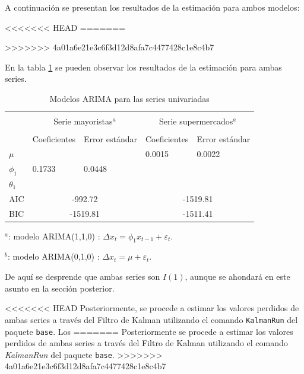 \documentclass[12pt, twoside]{book}\usepackage[]{graphicx}\usepackage[]{color}
\numberwithin{equation}{section}
\numberwithin{theorem}{section}
\numberwithin{teorema}{section}
\numberwithin{defi}{section}
\numberwithin{prop}{section}
\numberwithin{defi}{section}
\theoremstyle{plain}
\begin{document}
A continuación se presentan los resultados de la estimación para ambos modelos: 

<<<<<<< HEAD
=======

>>>>>>> 4a01a6e21e3c6f3d12d8afa7c4477428c1e8c4b7


En la tabla \ref{tab:Kalman} se pueden observar los resultados de la estimación para ambas series. 
\begin{center}
\begin{table}[!htbp]
\caption{Modelos ARIMA para las series univariadas\label{tab:Kalman}}
\centering
\begin{threeparttable}
\begin{tabular}{@{}lllll@{}}
\toprule \\
\multicolumn{1}{l}{} & \multicolumn{2}{c}{Serie mayoristas$^{a}$} &
\multicolumn{2}{c}{Serie supermercados$^{a}$} \\
\cmidrule(l){2-3} \cmidrule(l){4-5} \\
\multicolumn{1}{l}{} & \multicolumn{1}{c}{Coeficientes} &
 \multicolumn{1}{c}{Error estándar} &
\multicolumn{1}{l}{Coeficientes}&
\multicolumn{1}{l}{Error estándar}
\\
\midrule
$\mu       $ &        &          & 0.0015   &  0.0022 \\
$\phi_{1}  $ & 0.1733 &  0.0448  &          &          \\
$\theta_{1}$ &        &          &          &           \\
AIC          & \multicolumn{2}{c}{-992.72}  & \multicolumn{2}{c}{-1519.81} \\
BIC          & \multicolumn{2}{c}{-1519.81} & \multicolumn{2}{c}{-1511.41} \\
\bottomrule 
\end{tabular}
\begin{tablenotes}
\small 
\item $^{a}$: modelo ARIMA(1,1,0) : $\Delta x_{t}=\phi_{1}x_{t-1}+\varepsilon_{t}$. 
\item $^{b}$: modelo ARIMA(0,1,0) : $\Delta x_{t}=\mu+\varepsilon_{t}$. 
\end{tablenotes}
\end{threeparttable}
\end{table}
\end{center}

De aquí se desprende que ambas series son $I(1)$, aunque se ahondará en este asunto en la sección posterior. 

<<<<<<< HEAD
Posteriormente, se procede a estimar los valores perdidos de ambas series a través del Filtro de Kalman utilizando el comando \texttt{KalmanRun} del paquete \texttt{base}. Los 
=======
Posteriormente se procede a estimar los valores perdidos de ambas series a través del Filtro de Kalman utilizando el comando \textit{KalmanRun} del paquete \texttt{base}.
>>>>>>> 4a01a6e21e3c6f3d12d8afa7c4477428c1e8c4b7
\end{document}
